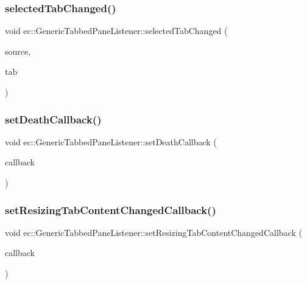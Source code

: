 \subsubsection{\texorpdfstring{selected\+Tab\+Changed()}{selectedTabChanged()}}
{\footnotesize\ttfamily void ec\+::\+Generic\+Tabbed\+Pane\+Listener\+::selected\+Tab\+Changed (\begin{DoxyParamCaption}\item[{agui\+::\+Tabbed\+Pane $\ast$}]{source,  }\item[{agui\+::\+Tab $\ast$}]{tab }\end{DoxyParamCaption})\hspace{0.3cm}{\ttfamily [override]}}

\mbox{\label{classec_1_1_generic_tabbed_pane_listener_a2da654f2864c7224a37bcc6cc0535d5a}} 
\subsubsection{\texorpdfstring{set\+Death\+Callback()}{setDeathCallback()}}
{\footnotesize\ttfamily void ec\+::\+Generic\+Tabbed\+Pane\+Listener\+::set\+Death\+Callback (\begin{DoxyParamCaption}\item[{const \mbox{\hyperlink{classec_1_1_generic_tabbed_pane_listener_a158699bc84b6a145e3dafec53ab63061}{Death\+\_\+\+Callback}} \&}]{callback }\end{DoxyParamCaption})}

\mbox{\label{classec_1_1_generic_tabbed_pane_listener_a84b64063845563fedf375ad3ab4881a2}} 
\subsubsection{\texorpdfstring{set\+Resizing\+Tab\+Content\+Changed\+Callback()}{setResizingTabContentChangedCallback()}}
{\footnotesize\ttfamily void ec\+::\+Generic\+Tabbed\+Pane\+Listener\+::set\+Resizing\+Tab\+Content\+Changed\+Callback (\begin{DoxyParamCaption}\item[{const \mbox{\hyperlink{classec_1_1_generic_tabbed_pane_listener_a41097f0918f8888f9e970e9c9a5f0d52}{Resizing\+Tab\+Content\+Changed\+\_\+\+Callback}} \&}]{callback }\end{DoxyParamCaption})}

